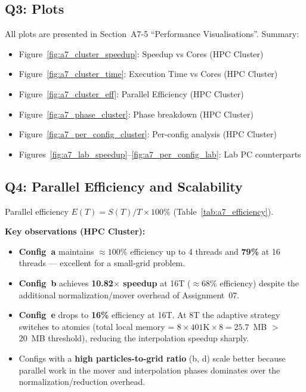 \documentclass[12pt,a4paper]{article}
\begin{document}
\subsection{Q3: Plots}

All plots are presented in Section~A7-5 ``Performance Visualisations''. Summary:
\begin{itemize}
    \item Figure~\ref{fig:a7_cluster_speedup}: Speedup vs Cores (HPC Cluster)
    \item Figure~\ref{fig:a7_cluster_time}: Execution Time vs Cores (HPC Cluster)
    \item Figure~\ref{fig:a7_cluster_eff}: Parallel Efficiency (HPC Cluster)
    \item Figure~\ref{fig:a7_phase_cluster}: Phase breakdown (HPC Cluster)
    \item Figure~\ref{fig:a7_per_config_cluster}: Per-config analysis (HPC Cluster)
    \item Figures~\ref{fig:a7_lab_speedup}--\ref{fig:a7_per_config_lab}: Lab PC counterparts
\end{itemize}

\subsection{Q4: Parallel Efficiency and Scalability}

Parallel efficiency $E(T) = S(T)/T \times 100\%$ (Table~\ref{tab:a7_efficiency}).

\textbf{Key observations (HPC Cluster):}
\begin{itemize}
    \item \textbf{Config~a} maintains $\approx\!100\%$ efficiency up to 4 threads and
          \textbf{79\%} at 16 threads --- excellent for a small-grid problem.
    \item \textbf{Config~b} achieves \textbf{10.82$\times$ speedup} at 16T ($\approx\!68\%$
          efficiency) despite the additional normalization/mover overhead of Assignment~07.
    \item \textbf{Config~e} drops to \textbf{16\%} efficiency at 16T. At 8T the adaptive
          strategy switches to atomics (total local memory = $8 \times 401\text{K} \times 8
          = 25.7$~MB $>$ 20~MB threshold), reducing the interpolation speedup sharply.
    \item Configs with a \textbf{high particles-to-grid ratio} (b, d) scale better because
          parallel work in the mover and interpolation phases dominates over the
          normalization/reduction overhead.
\end{itemize}
\end{document}
